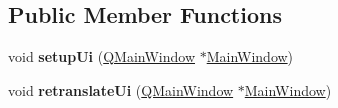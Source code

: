 \subsection*{Public Member Functions}
\begin{DoxyCompactItemize}
\item 
\mbox{\label{class_ui___main_window_acf4a0872c4c77d8f43a2ec66ed849b58}} 
void {\bfseries setup\+Ui} (\hyperlink{class_q_main_window}{Q\+Main\+Window} $\ast$\hyperlink{class_main_window}{Main\+Window})
\item 
\mbox{\label{class_ui___main_window_a097dd160c3534a204904cb374412c618}} 
void {\bfseries retranslate\+Ui} (\hyperlink{class_q_main_window}{Q\+Main\+Window} $\ast$\hyperlink{class_main_window}{Main\+Window})
\end{DoxyCompactItemize}
